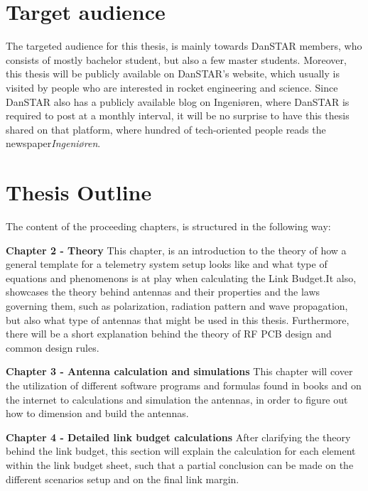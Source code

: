 \section{Target audience}
The targeted audience for this thesis, is mainly towards DanSTAR members, who consists of mostly bachelor student, but also a few master students. Moreover, this thesis will be publicly available on DanSTAR's website\cite{DanSTAR}, which usually is visited by people who are interested in rocket engineering and science. Since DanSTAR also has a publicly available blog\cite{DanSTARblog} on Ingeniøren\cite{Ingenioeren}, where DanSTAR is required to post at a monthly interval, it will be no surprise to have this thesis shared on that platform, where hundred of tech-oriented people reads the newspaper\textit{Ingeniøren}.    

\section{Thesis Outline}
The content of the proceeding chapters, is structured in the following way:


\textbf{Chapter 2 - Theory}
This chapter, is an introduction to the theory of how a general template for a telemetry system setup looks like and what type of equations and phenomenons is at play when calculating the Link Budget.It also, showcases the theory behind antennas and their properties and the laws governing them, such as polarization, radiation pattern and wave propagation, but also what type of antennas that might be used in this thesis. Furthermore, there will be a short explanation behind the theory of RF PCB design and common design rules.


\textbf{Chapter 3 - Antenna calculation and simulations}
This chapter will cover the utilization of different software programs and formulas found in books and on the internet to calculations and simulation the antennas, in order to figure out how to dimension and build the antennas.

\textbf{Chapter 4 - Detailed link budget calculations}
After clarifying the theory behind the link budget, this section will explain the calculation for each element within the link budget sheet, such that a partial conclusion can be made on the different scenarios setup and on the final link margin. 

